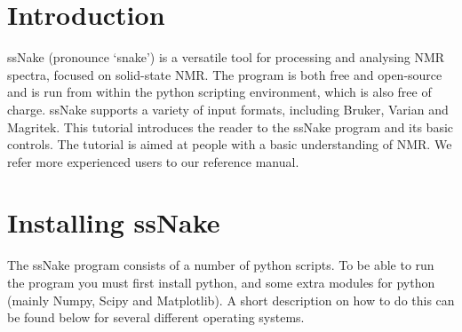 \documentclass[11pt,a4paper]{article}
\renewcommand\cfttoctitlefont{\color{black!70}\Huge\fontfamily{SourceSansPro-LF}\bfseries}
\begin{document}


\thispagestyle{empty}
\newpage
\mbox{}


\renewcommand\cfttoctitlefont{\color{black}\Huge\fontfamily{SourceSansPro-LF}\bfseries}
\tableofcontents %

\renewcommand\cfttoctitlefont{\color{black!70}\Huge\fontfamily{SourceSansPro-LF}\bfseries}


\section{Introduction}
ssNake (pronounce `snake') is a versatile tool for processing and analysing NMR spectra, focused on solid-state NMR. The program is both free and open-source and is run from within the python scripting environment, which is also free of charge. ssNake supports a variety of input formats, including Bruker, Varian and Magritek. This tutorial introduces the reader to the ssNake program and its basic controls. The tutorial is aimed at people with a basic understanding of NMR. We refer more experienced users to our reference manual.


\section{Installing ssNake}

The ssNake program consists of a number of python scripts. To be able to run the program you must first install python, and some extra modules for python (mainly Numpy, Scipy and Matplotlib). A short description on how to do this can be found below for several different operating systems.
\end{document}
